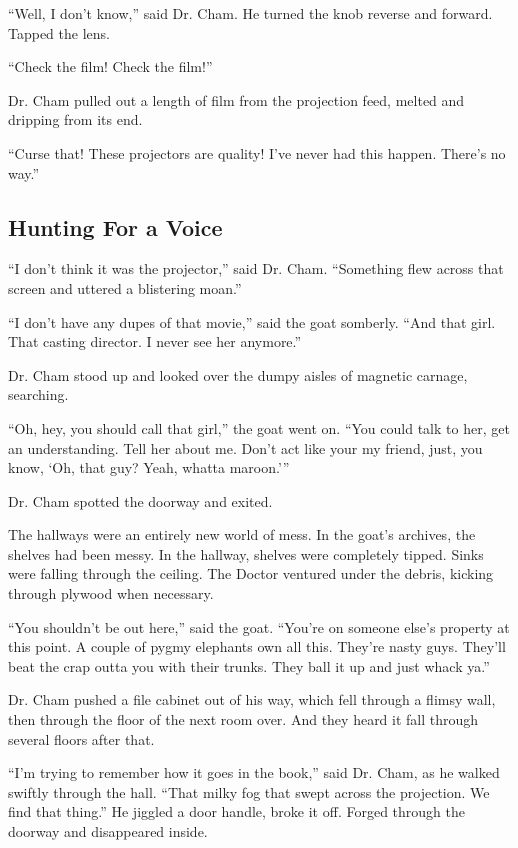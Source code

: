 \documentclass[12pt,twoside]{report}
\begin{document}
``Well, I don't know,'' said Dr. Cham.  He turned the knob reverse and
        forward. Tapped the lens.

``Check the film!  Check the film!''

Dr. Cham pulled out a length of film from the projection feed, melted
and dripping from its end.

``Curse that!  These projectors are quality!  I've never had this
happen.  There's no way.''



\subsection{Hunting For a Voice}



``I don't think it was the projector,'' said Dr. Cham.  ``Something
flew across that screen and uttered a blistering moan.''

``I don't have any dupes of that movie,'' said the goat somberly.
``And that girl.  That casting director.  I never see her anymore.''

Dr. Cham stood up and looked over the dumpy aisles of magnetic
carnage, searching.

``Oh, hey, you should call that girl,'' the goat went on. ``You could
talk to her, get an understanding. Tell her about me.  Don't act like
your my friend, just, you know, `Oh, that guy? Yeah, whatta maroon.'''

Dr. Cham spotted the doorway and exited.

The hallways were an entirely new world of mess.  In the goat's
archives, the shelves had been messy. In the hallway, shelves were
completely tipped.  Sinks were falling through the ceiling.  The
Doctor ventured under the debris, kicking through plywood when
necessary.

``You shouldn't be out here,'' said the goat.  ``You're on someone
else's property at this point. A couple of pygmy elephants own all
this.  They're nasty guys.  They'll beat the crap outta you with their
trunks.  They ball it up and just whack ya.''

Dr. Cham pushed a file cabinet out of his way, which fell through a
flimsy wall, then through the floor of the next room over.  And they
heard it fall through several floors after that.

``I'm trying to remember how it goes in the book,'' said Dr. Cham, as
he walked swiftly through the hall.  ``That milky fog that swept
across the projection.  We find that thing.''  He jiggled a door
handle, broke it off.  Forged through the doorway and disappeared
inside.
\end{document}
